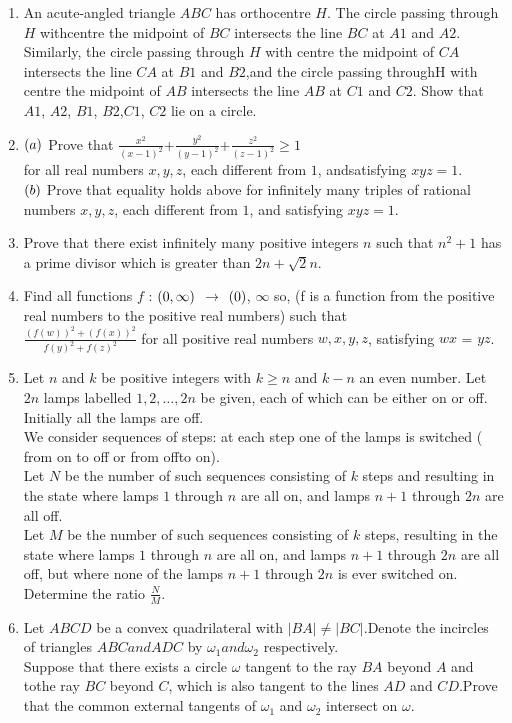 \documentclass[12pt,-letter paper]{article}
\begin{document}
\begin{enumerate}
\item An acute-angled triangle $ABC$ has orthocentre $H$. The circle passing through $H$ withcentre the midpoint of $BC$ intersects the line $BC$ at $A1$ and $A2$. Similarly, the circle passing through $H$ with centre the midpoint of $CA$ intersects the line $CA$ at $B1$ and $B2$,and the circle passing throughH with centre the midpoint of $AB$ intersects the line $AB$ at $C1$ and $C2$. Show that $A1$, $A2$, $B1$, $B2$,$C1$, $C2$ lie on a circle.
\item $\left(a\right)$ Prove that 
$\frac{x^2}{{(x-1)}^{2}}$+$\frac{y^2}{{(y-1)}^{2}}$+$\frac{z^2}{{(z-1)}^{2}} \geq 1$ \\ 
for all real numbers $x, y, z$, each different from $1$, andsatisfying $xyz = 1$.\\

	$\left(b\right)$ Prove that equality holds above for infinitely many triples of rational numbers $x, y, z$, each different from $1$, and satisfying $xyz=1$.
\item Prove that there exist infinitely many positive integers $n$ such that $n^2+1$ has a prime divisor which is greater than $2n+\sqrt2n$.
\item Find all functions $f$ : $\left(0,\infty\right)$ $\rightarrow$ $\left(0\right)$, $\infty$  so, (f is a function from the positive real numbers to the positive real numbers) such that \\
	$\frac{(f(w))^2 + (f(x))^2} {f(y)^2 + f(z)^2 }$
	for all positive real numbers $w, x, y, z$, satisfying $wx$ = $yz$.
\item  Let $n$ and $k$ be positive integers with $k\geq n$ and $k-n$ an even number. Let $2n$ lamps labelled $1, 2,\dots, 2n$ be given, each of which can be either on or off. Initially all the lamps are off.\\

	We consider sequences of steps: at each step one of the lamps is switched ( from on to off or from offto on).\\

Let $N$ be the number of such sequences consisting of $k$ steps and resulting in the state where lamps $1$ through $n$ are all on, and lamps $n + 1$ through $2n$ are all off.\\

Let $M$ be the number of such sequences consisting of $k$ steps, resulting in the state where lamps $1$ through $n$ are all on, and lamps $n + 1$ through $2n$ are all off, but where none of the lamps $n + 1$ through $2n$ is ever switched on.\\
	Determine the ratio $\frac{N}{M}$.

\item Let $ABCD$ be a convex quadrilateral with $|BA| \neq |BC|$.Denote the incircles of triangles $ABC and ADC$ by $\omega_1 and \omega_2$ respectively.\\
Suppose that there exists a circle $\omega$ tangent to the ray $BA$ beyond $A$ and tothe ray $BC$ beyond $C$, which is also tangent to the lines $AD$ and $CD$.Prove that the common external tangents of $\omega_1$ and $\omega_2$ intersect on $\omega$.
\end{enumerate}
\end{document}
